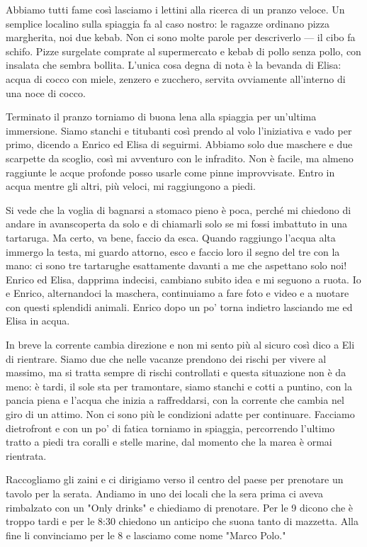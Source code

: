 Abbiamo tutti fame così lasciamo i lettini alla ricerca di un pranzo veloce. Un semplice localino sulla spiaggia fa al caso nostro: le ragazze ordinano pizza margherita, noi due kebab. Non ci sono molte parole per descriverlo — il cibo fa schifo. Pizze surgelate comprate al supermercato e kebab di pollo senza pollo, con insalata che sembra bollita. L'unica cosa degna di nota è la bevanda di Elisa: acqua di cocco con miele, zenzero e zucchero, servita ovviamente all'interno di una noce di cocco.

Terminato il pranzo torniamo di buona lena alla spiaggia per un'ultima immersione. Siamo stanchi e titubanti così prendo al volo l'iniziativa e vado per primo, dicendo a Enrico ed Elisa di seguirmi. Abbiamo solo due maschere e due scarpette da scoglio, così mi avventuro con le infradito. Non è facile, ma almeno raggiunte le acque profonde posso usarle come pinne improvvisate. Entro in acqua mentre gli altri, più veloci, mi raggiungono a piedi.

Si vede che la voglia di bagnarsi a stomaco pieno è poca, perché mi chiedono di andare in avanscoperta da solo e di chiamarli solo se mi fossi imbattuto in una tartaruga. Ma certo, va bene, faccio da esca. Quando raggiungo l'acqua alta immergo la testa, mi guardo attorno, esco e faccio loro il segno del tre con la mano: ci sono tre tartarughe esattamente davanti a me che aspettano solo noi! Enrico ed Elisa, dapprima indecisi, cambiano subito idea e mi seguono a ruota. Io e Enrico, alternandoci la maschera, continuiamo a fare foto e video e a nuotare con questi splendidi animali. Enrico dopo un po' torna indietro lasciando me ed Elisa in acqua.

In breve la corrente cambia direzione e non mi sento più al sicuro così dico a Eli di rientrare. Siamo due che nelle vacanze prendono dei rischi per vivere al massimo, ma si tratta sempre di rischi controllati e questa situazione non è da meno: è tardi, il sole sta per tramontare, siamo stanchi e cotti a puntino, con la pancia piena e l'acqua che inizia a raffreddarsi, con la corrente che cambia nel giro di un attimo. Non ci sono più le condizioni adatte per continuare. Facciamo dietrofront e con un po' di fatica torniamo in spiaggia, percorrendo l’ultimo tratto a piedi tra coralli e stelle marine, dal momento che la marea è ormai rientrata.

Raccogliamo gli zaini e ci dirigiamo verso il centro del paese per prenotare un tavolo per la serata. Andiamo in uno dei locali che la sera prima ci aveva rimbalzato con un "Only drinks" e chiediamo di prenotare. Per le 9 dicono che è troppo tardi e per le 8:30 chiedono un anticipo che suona tanto di mazzetta. Alla fine li convinciamo per le 8 e lasciamo come nome "Marco Polo."

